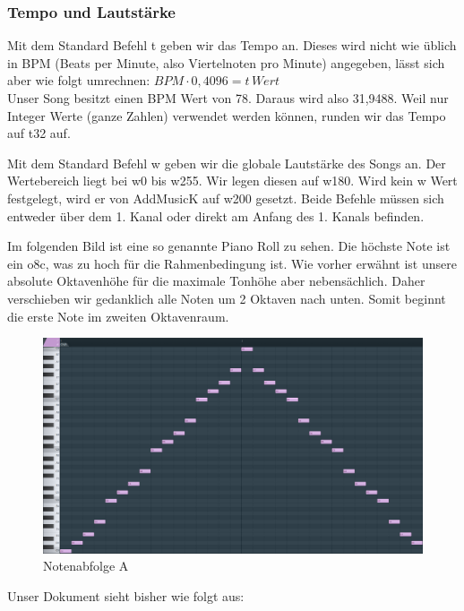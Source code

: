 \subsubsection{Tempo und Lautstärke}
Mit dem Standard Befehl t geben wir das Tempo an. Dieses wird nicht wie üblich in BPM (Beats per Minute, also Viertelnoten pro Minute) angegeben, lässt sich aber wie folgt umrechnen: $ BPM \cdot 0,4096 = t \, Wert $ \\
Unser Song besitzt einen BPM Wert von 78. Daraus wird also 31,9488. Weil nur Integer Werte (ganze Zahlen) verwendet werden können, runden wir das Tempo auf t32 auf.

\bigskip

Mit dem Standard Befehl w geben wir die globale Lautstärke des Songs an. Der Wertebereich liegt bei w0 bis w255. Wir legen diesen auf w180. Wird kein w Wert festgelegt, wird er von AddMusicK auf w200 gesetzt. Beide Befehle müssen sich entweder über dem 1. Kanal oder direkt am Anfang des 1. Kanals befinden.

\bigskip

Im folgenden Bild ist eine so genannte Piano Roll zu sehen. Die höchste Note ist ein o8c, was zu hoch für die Rahmenbedingung ist. Wie vorher erwähnt ist unsere absolute Oktavenhöhe für die maximale Tonhöhe aber nebensächlich. Daher verschieben wir gedanklich alle Noten um 2 Oktaven nach unten. Somit beginnt die erste Note im zweiten Oktavenraum. 

\begin{figure}[htbp] \centering
	\includegraphics[width=.95\linewidth]{images/Noten_A.png}
	\caption{Notenabfolge A}
	\label{NotenabfolgeA}
\end{figure}
Unser Dokument sieht bisher wie folgt aus:

\medskip



